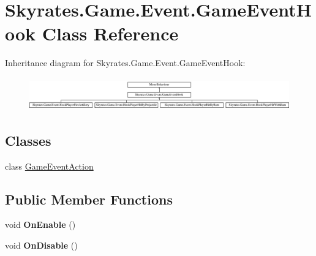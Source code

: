 \hypertarget{class_skyrates_1_1_game_1_1_event_1_1_game_event_hook}{\section{Skyrates.\-Game.\-Event.\-Game\-Event\-Hook Class Reference}
\label{class_skyrates_1_1_game_1_1_event_1_1_game_event_hook}
}
Inheritance diagram for Skyrates.\-Game.\-Event.\-Game\-Event\-Hook\-:\begin{figure}[H]
\begin{center}
\leavevmode
\includegraphics[height=1.428571cm]{class_skyrates_1_1_game_1_1_event_1_1_game_event_hook}
\end{center}
\end{figure}
\subsection*{Classes}
\begin{DoxyCompactItemize}
\item 
class \hyperlink{class_skyrates_1_1_game_1_1_event_1_1_game_event_hook_1_1_game_event_action}{Game\-Event\-Action}
\end{DoxyCompactItemize}
\subsection*{Public Member Functions}
\begin{DoxyCompactItemize}
\item 
\hypertarget{class_skyrates_1_1_game_1_1_event_1_1_game_event_hook_ab674affd4f9bd26f5b11e8c785a36801}{void {\bfseries On\-Enable} ()}\label{class_skyrates_1_1_game_1_1_event_1_1_game_event_hook_ab674affd4f9bd26f5b11e8c785a36801}

\item 
\hypertarget{class_skyrates_1_1_game_1_1_event_1_1_game_event_hook_a7e3c8ece14bcc49fe148ad6360512e60}{void {\bfseries On\-Disable} ()}\label{class_skyrates_1_1_game_1_1_event_1_1_game_event_hook_a7e3c8ece14bcc49fe148ad6360512e60}

\end{DoxyCompactItemize}
